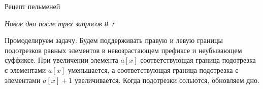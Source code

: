 \begin{tutorial}{Рецепт пельменей}
\begin{center}
  \textit{Новое дно после трех запросов \texttt{8 r}}
\end{center}

Промоделируем задачу. Будем поддерживать правую и левую границы подотрезков равных элементов в невозрастающем префиксе и неубывающем суффиксе. При увеличении элемента $a[x]$ соответствующая граница подотрезка с элементами $a[x]$ уменьшается, а соответствующая граница подотрезка с элементами $a[x] + 1$ увеличивается. Когда подотрезки сольются, обновляем дно.

\end{tutorial}
